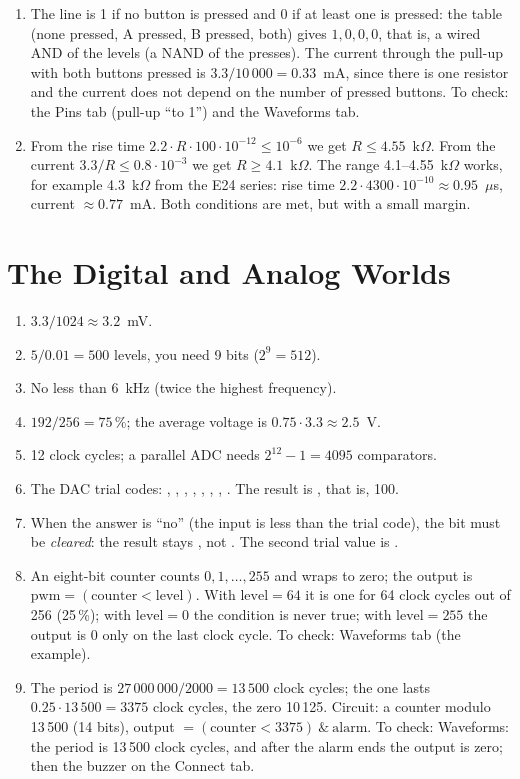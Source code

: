 \begin{enumerate}
  \item {} The line is 1 if no button is pressed and 0 if at least one is pressed: the table (none pressed, A pressed, B pressed, both) gives $1,0,0,0$, that is, a wired AND of the levels (a NAND of the presses). The current through the pull-up with both buttons pressed is $3.3/10\,000=0.33$~mA, since there is one resistor and the current does not depend on the number of pressed buttons. To check: the Pins tab (pull-up ``to 1'') and the Waveforms tab.
  \item {} From the rise time $2.2\cdot R\cdot 100\cdot 10^{-12}\le 10^{-6}$ we get $R\le 4.55$~k$\Omega$. From the current $3.3/R\le 0.8\cdot 10^{-3}$ we get $R\ge 4.1$~k$\Omega$. The range 4.1--4.55~k$\Omega$ works, for example 4.3~k$\Omega$ from the E24 series: rise time $2.2\cdot4300\cdot10^{-10}\approx 0.95$~$\mu$s, current $\approx 0.77$~mA. Both conditions are met, but with a small margin.
\end{enumerate}

\section*{The Digital and Analog Worlds}
\begin{enumerate}
  \item {} $3.3/1024\approx 3.2$~mV.
  \item {} $5/0.01 = 500$ levels, you need 9 bits ($2^9=512$).
  \item {} No less than 6~kHz (twice the highest frequency).
  \item {} $192/256=75\,\%$; the average voltage is $0.75\cdot 3.3\approx 2.5$~V.
  \item {} 12 clock cycles; a parallel ADC needs $2^{12}-1 = 4095$ comparators.
  \item {} The DAC trial codes: , , , , , , , . The result is , that is, 100.
  \item {} When the answer is ``no'' (the input is less than the trial code), the bit must be \emph{cleared}: the result stays , not . The second trial value is .
  \item {} An eight-bit counter counts $0,1,\ldots,255$ and wraps to zero; the output is $\text{pwm}=(\text{counter}<\text{level})$. With $\text{level}=64$ it is one for 64 clock cycles out of 256 (25\,\%); with $\text{level}=0$ the condition is never true; with $\text{level}=255$ the output is 0 only on the last clock cycle. To check: Waveforms tab (the  example).
  \item {} The period is $27\,000\,000/2000=13\,500$ clock cycles; the one lasts $0.25\cdot 13\,500=3375$ clock cycles, the zero 10\,125. Circuit: a counter modulo 13\,500 (14 bits), output $=(\text{counter}<3375)\ \&\ \text{alarm}$. To check: Waveforms: the period is 13\,500 clock cycles, and after the alarm ends the output is zero; then the buzzer on the Connect tab.
\end{enumerate}

